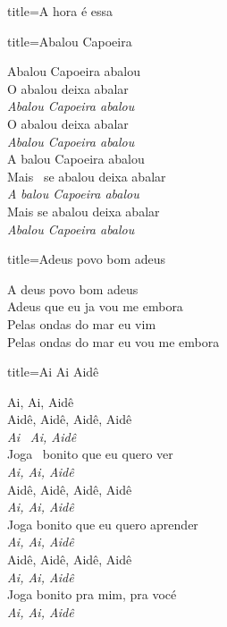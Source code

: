 \documentclass[fontsize=14pt, paper=a4, twoside, DIV=20]{scrreprt} %
\begin{document}
\begin{multicols*}{2}
\begin{song}{title={A hora é essa}}

\end{song}

\begin{song}{title={Abalou Capoeira}}
\begin{verse*}
Abalou Capoeira abalou\\
O abalou deixa abalar\\
\textit{Abalou Capoeira abalou}\\
O abalou deixa abalar\\
\textit{Abalou Capoeira abalou}\\

A balou Capoeira abalou\\
Mais \ se abalou deixa abalar\\
\textit{A} \textit{balou Capoeira abalou}\\
Mais se abalou deixa abalar\\
\textit{Abalou Capoeira abalou}\\

\end{verse*}
\end{song}

\begin{song}{title={Adeus povo bom adeus}}
    \begin{verse*}
         A deus povo bom adeus\\
        Adeus que eu ja vou me embora\\
        Pelas ondas do mar eu vim\\
        Pelas ondas do mar eu vou me embora\\
    \end{verse*}
        \end{song}
\pagebreak
\begin{song}{title={Ai Ai Aidê}}
    \begin{verse*}
     Ai, Ai, Aidê\\
    Aidê, Aidê, Aidê, Aidê\\
    \textit{Ai}  \ \textit{Ai, Aidê}\\
    Joga \ bonito que eu quero ver\\
    \textit{Ai, Ai, Aidê}\\
    Aidê, Aidê, Aidê, Aidê\\
    \textit{Ai, Ai, Aidê}\\
    Joga bonito que eu quero aprender\\
    \textit{Ai, Ai, Aidê}\\
    Aidê, Aidê, Aidê, Aidê\\
    \textit{Ai, Ai, Aidê}\\
    Joga bonito pra mim, pra vocé\\
    \textit{Ai, Ai, Aidê}\\
    \end{verse*}
    \end{song}


\end{multicols*}
\end{document}
